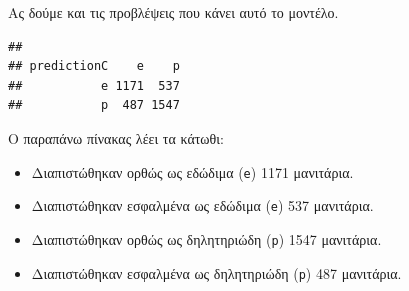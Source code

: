 \documentclass[
]{article}
\newenvironment{Shaded}{\begin{snugshade}}{\end{snugshade}}
\newcommand{\AttributeTok}[1]{\textcolor[rgb]{0.13,0.29,0.53}{#1}}
\newcommand{\FunctionTok}[1]{\textcolor[rgb]{0.13,0.29,0.53}{\textbf{#1}}}
\newcommand{\NormalTok}[1]{#1}
\newcommand{\OtherTok}[1]{\textcolor[rgb]{0.56,0.35,0.01}{#1}}
\newcommand{\SpecialCharTok}[1]{\textcolor[rgb]{0.81,0.36,0.00}{\textbf{#1}}}
\newcommand{\StringTok}[1]{\textcolor[rgb]{0.31,0.60,0.02}{#1}}
\begin{document}
Ας δούμε και τις προβλέψεις που κάνει αυτό το μοντέλο.

\begin{Shaded}
\end{Shaded}

\begin{verbatim}
##            
## predictionC    e    p
##           e 1171  537
##           p  487 1547
\end{verbatim}

Ο παραπάνω πίνακας λέει τα κάτωθι:

\begin{itemize}
\item
  Διαπιστώθηκαν ορθώς ως εδώδιμα (\texttt{e}) 1171 μανιτάρια.
\item
  Διαπιστώθηκαν εσφαλμένα ως εδώδιμα (\texttt{e}) 537 μανιτάρια.
\item
  Διαπιστώθηκαν ορθώς ως δηλητηριώδη (\texttt{p}) 1547 μανιτάρια.
\item
  Διαπιστώθηκαν εσφαλμένα ως δηλητηριώδη (\texttt{p}) 487 μανιτάρια.
\end{itemize}
\end{document}
